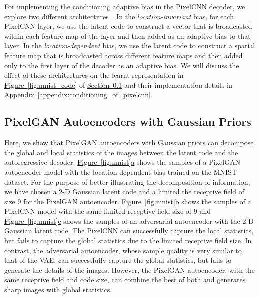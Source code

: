 \documentclass{article}
\newcommand{\mysec}[1]{\hyperref[sec:#1]{Section~\ref*{sec:#1}}}
\newcommand{\myfig}[1]{\hyperref[fig:#1]{Figure~\ref*{fig:#1}}}
\newcommand{\myfigg}[2]{\hyperref[fig:#1]{Figure~\ref*{fig:#1}#2}}
\newcommand{\myappendix}[1]{\hyperref[appendix:#1]{Appendix~\ref*{appendix:#1}}}
\begin{document}
For implementing the conditioning adaptive bias in the PixelCNN decoder, we explore two different architectures~\citep{pixelcnn}. In the \emph{location-invariant} bias, for each PixelCNN layer, we use the latent code to construct a vector that is broadcasted within each feature map of the layer and then added as an adaptive bias to that layer. In the \emph{location-dependent} bias, we use the latent code to construct a spatial feature map that is broadcasted across different feature maps and then added only to the first layer of the decoder as an adaptive bias. We will discuss the effect of these architectures on the learnt representation in \myfig{mnist_code} of \mysec{pixelgan_gaussian} and their implementation details in \myappendix{conditioning_of_pixelcnn}.

\subsection{PixelGAN Autoencoders with Gaussian Priors}\label{sec:pixelgan_gaussian}
Here, we show that PixelGAN autoencoders with Gaussian priors can decompose the global and local statistics of the images between the latent code and the autoregressive decoder. \myfigg{mnist}{a} shows the samples of a PixelGAN autoencoder model with the location-dependent bias trained on the MNIST dataset.
For the purpose of better illustrating the decomposition of information, we have chosen a 2-D Gaussian latent code and a limited the receptive field of size 9 for the PixelGAN autoencoder. \myfigg{mnist}{b} shows the samples of a PixelCNN model with the same limited receptive field size of 9 and \myfigg{mnist}{c} shows the samples of an adversarial autoencoder with the 2-D Gaussian latent code. The PixelCNN can successfully capture the local statistics, but fails to capture the global statistics due to the limited receptive field size. In contrast, the adversarial autoencoder, whose sample quality is very similar to that of the VAE, can successfully capture the global statistics, but fails to generate the details of the images. However, the PixelGAN autoencoder, with the same receptive field and code size, can combine the best of both and generates sharp images with global statistics. 
\end{document}

